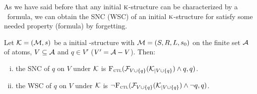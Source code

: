 \documentclass{article}
\begin{document}
 As we have said before that any initial $\textsc{k}$-structure can be characterized by a \CTL\ formula, we can obtain the SNC (WSC) of an initial $\textsc{k}$-structure for satisfy some needed property (formula) by forgetting.
\begin{theorem}\label{thm:inK:SNC}
Let ${\cal K}= ({\cal M}, s)$ be a initial \MPK-structure with ${\cal M}=(S,R,L,s_0)$ on the finite set ${\cal A}$ of atoms, $V \subseteq {\cal A}$ and $q\in V'$ ($V' = {\cal A} - V$). Then:
 \begin{enumerate}[(i)]
   \item the SNC of $q$ on $V$ under ${\cal K}$ is ${\textsc{F}_{\textsc{ctl}}}({\cal F}_{V \cup \{q\}}({\cal K}_{|V \cup \{q\}}) \wedge q, q)$.
   \item the WSC of $q$ on $V$ under ${\cal K}$ is $\neg {\textsc{F}_{\textsc{ctl}}}({\cal F}_{V \cup \{q\}}({\cal K}_{|V \cup \{q\}}) \wedge \neg q, q)$.
 \end{enumerate}
\end{theorem}
%
\end{document}
